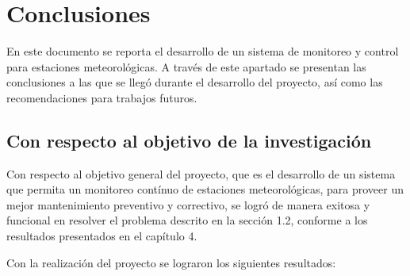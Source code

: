 \chapter{Conclusiones}\label{conclusiones}

En este documento se reporta el desarrollo de un sistema de monitoreo y control para estaciones meteorológicas. A través de este apartado se presentan las conclusiones a las que se llegó durante el desarrollo del proyecto, así como las recomendaciones para trabajos futuros.


\section{Con respecto al objetivo de la investigación}



Con respecto al objetivo general del proyecto, que es el desarrollo de un sistema que permita un monitoreo contínuo de estaciones meteorológicas, para proveer un mejor mantenimiento preventivo y correctivo, se logró de manera exitosa y funcional en resolver el problema descrito en la sección 1.2, conforme a los resultados presentados en el capítulo 4.


Con la realización del proyecto se lograron los siguientes resultados:


